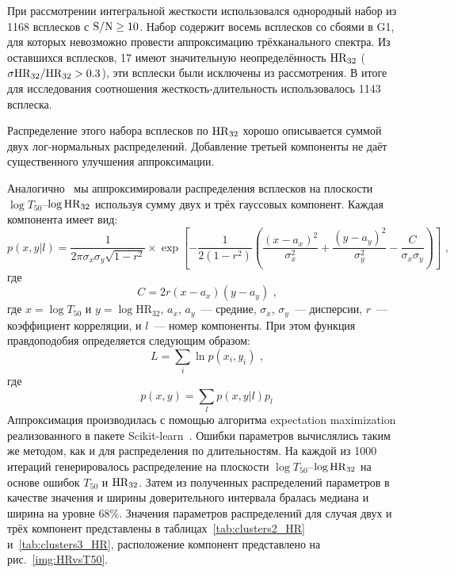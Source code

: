 При рассмотрении интегральной жесткости использовался однородный набор из 1168 
всплесков с ${\mathrm{S/N}} \geq 10$. Набор содержит восемь всплесков со сбоями в G1, 
для которых невозможно провести аппроксимацию трёхканального спектра. 
Из оставшихся всплесков, 17 имеют значительную неопределённость ${\mathrm{HR}}_{32}$ 
($\sigma{\mathrm{HR}}_{32}/{\mathrm{HR}}_{32} >0.3$), эти всплески были исключены из рассмотрения. 
В итоге для исследования соотношения жесткость-длительность использовалось 1143 всплеска.

Распределение этого набора всплесков по ${\mathrm{HR}}_{32}$ хорошо описывается суммой двух 
лог-нормальных распределений. Добавление третьей компоненты не даёт существенного 
улучшения аппроксимации. 

Аналогично~\citep{Horvath_2006} мы аппроксимировали распределения всплесков на 
плоскости $\log T_{50}$--$\log {\mathrm{HR}}_{32}$ используя сумму двух и трёх 
гауссовых компонент. Каждая компонента имеет вид: 
\begin{equation}
p(x,y| l) = \frac{1}{2\pi \sigma_x \sigma_y \sqrt{1-r^2}} \times 
\exp\left[ -\frac{1}{2(1-r^2)}\left( \frac{(x-a_x)^2}{\sigma_x^2} + 
\frac{(y-a_y)^2}{\sigma_y^2} -\frac{C}{\sigma_x \sigma_y}\right)\right]\mbox{ ,}
\end{equation}
где
\begin{equation}
C = 2r(x-a_x)(y-a_y)\mbox{ ,} \nonumber
\end{equation}
где $x=\log T_{50}$ и $y=\log \mbox{HR}_{32}$,  $a_x$, $a_y$~--- средние, 
$\sigma_x$, $\sigma_y$~--- дисперсии, $r$~--- коэффициент корреляции, 
и $l$~--- номер компоненты. При этом функция правдоподобия определяется следующим образом:
\begin{equation}
L = \sum_i \ln p(x_i, y_i)\mbox{ ,}
\end{equation}
где
\begin{equation}
p(x,y) = \sum_l  p(x, y|l)p_l \nonumber
\end{equation}
Аппроксимация производилась с помощью алгоритма 
expectation maximization~\citep{Horvath_2006, Balazs_2003AA} реализованного в пакете 
Scikit-learn~\citep{scikit-learn}. 
Ошибки параметров вычислялись таким же методом, как и для распределения по длительностям. 
На каждой из 1000 итераций генерировалось распределение на плоскости  
$\log T_{50}$--$\log{\mathrm{HR}}_{32}$ на основе ошибок $T_{50}$ и ${\mathrm{HR}}_{32}$. 
Затем из полученных распределений параметров в качестве значения и ширины доверительного 
интервала бралась медиана и ширина на уровне 68\%. Значения параметров распределений 
для случая двух и трёх компонент представлены в таблицах~\ref{tab:clusters2_HR} 
и~\ref{tab:clusters3_HR}, расположение компонент представлено на рис.~\ref{img:HRvsT50}. 

